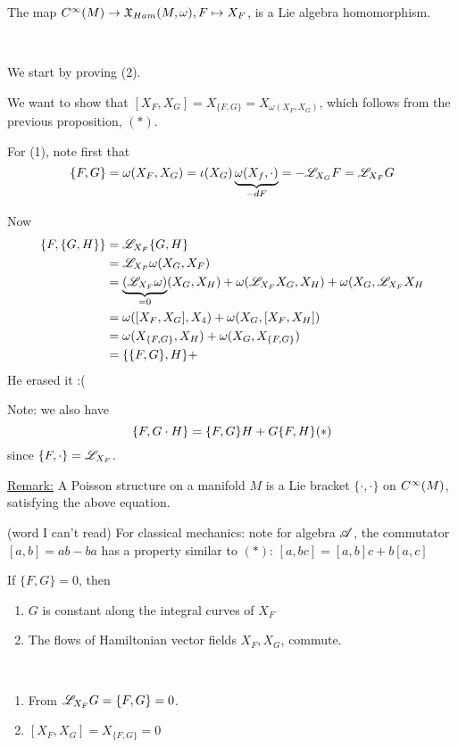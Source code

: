 \documentclass[x11names,reqno,14pt]{extarticle}
\newcommand{\mk}[1]{\mathfrak{#1}}
\newcommand{\pois}[2]{\{#1,#2\}}
\begin{document}
The map $C^\oo(M) \to \mk{X}_{Ham}(M,\omega), F \mapsto X_F$, is a Lie algebra homomorphism. 

\proof\,

We start by proving (2). 

We want to show that $[X_F,X_G] = X_{\pois{F}{G}} = X_{\omega(X_F,X_G)}$, which follows from the previous proposition, $(*)$.

For (1), note first that 
\[
\pois{F}{G} = \omega(X_F,X_G) = \iota(X_G)\underbrace{\omega(X_f,\cdot)}_{-dF} = -\ms{L}_{X_G}F = \ms{L}_{X_F}G
\]

Now 
\begin{align*}
\pois{F}{\pois{G}{H}} & = \ms{L}_{X_F}\pois{G}{H} \\
& = \ms{L}_{X_F}\omega(X_G,X_F) \\
& = \underbrace{(\ms{L}_{X_F}\omega)}_{=0}(X_G,X_H) + \omega(\ms{L}_{X_F}X_G,X_H) + \omega(X_G,\ms{L}_{X_F}X_H \\
& = \omega([X_F,X_G],X_4) + \omega(X_G,[X_F,X_H]) \\
& = \omega(X_{\pois{F}{G}},X_H) + \omega(X_G, X_{\pois{F}{G}}) \\
& = \pois{\pois{F}{G}}{H} + 
\end{align*}
He erased it :(

Note: we also have 
\[
\pois{F}{G\cdot H} = \pois{F}{G}H + G\pois{F}{H}\hfill\hfill(*)
\]
since $\pois{F}{\cdot} = \ms{L}_{X_F}$. 

\underline{Remark:} A Poisson structure on a manifold $M$ is a Lie bracket $\pois{\cdot}{\cdot}$ on $C^\infty(M)$, satisfying the above equation.

(word I can't read) For classical mechanics: note for algebra $\mathscr{A}$, the commutator $[a,b] = ab - ba$ has a property similar to $(*)$: $[a,bc] = [a,b]c + b[a,c]$

\prop

If $\pois{F}{G} = 0$, then 
\begin{enumerate}[label=(\alph*)]

\item $G$ is constant along the integral curves of $X_F$

\item The flows of Hamiltonian vector fields $X_F, X_G$, commute. 

\end{enumerate}

\proof
\,
\begin{enumerate}[label=(\alph*)]

\item From $\ms{L}_{X_F}G = \pois{F}{G} = 0$. 

\item $[X_F,X_G] = X_{\pois{F}{G}} = 0$

\end{enumerate}
\end{document}
